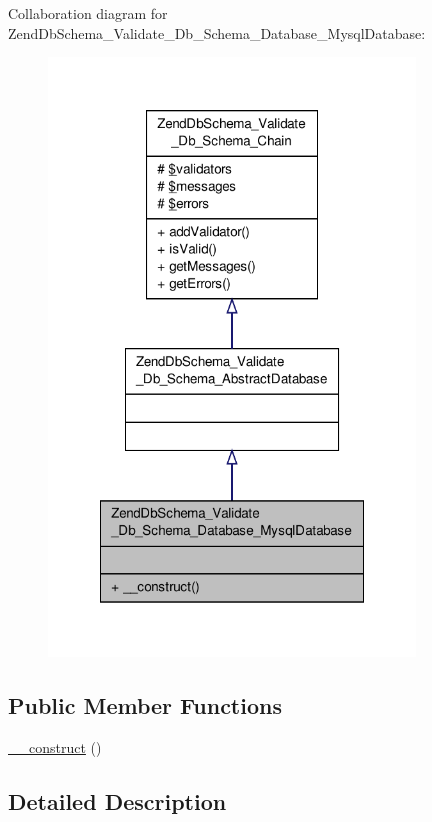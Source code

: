 Collaboration diagram for Zend\-Db\-Schema\-\_\-\-Validate\-\_\-\-Db\-\_\-\-Schema\-\_\-\-Database\-\_\-\-Mysql\-Database\-:\nopagebreak
\begin{figure}[H]
\begin{center}
\leavevmode
\includegraphics[width=276pt]{classZendDbSchema__Validate__Db__Schema__Database__MysqlDatabase__coll__graph}
\end{center}
\end{figure}
\subsection*{Public Member Functions}
\begin{DoxyCompactItemize}
\item 
\hyperlink{classZendDbSchema__Validate__Db__Schema__Database__MysqlDatabase_a5912347d8a447d39dafa9ea2a8cf77e1}{\-\_\-\-\_\-construct} ()
\end{DoxyCompactItemize}


\subsection{Detailed Description}


